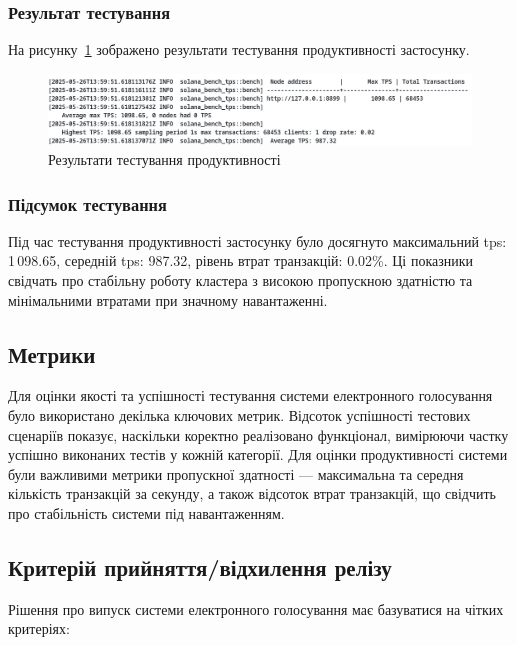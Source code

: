 \documentclass[14pt]{extreport}
\begin{document}
  \subsubsection*{Результат тестування}
  
  На рисунку~\ref{fig:prodtests} зображено результати тестування продуктивності застосунку.

  \begin{figure}[H]
    \centering
    \includegraphics[width=\textwidth]{ProdTest}
    \caption{Результати тестування продуктивності}
    \label{fig:prodtests}
  \end{figure}
  
  \subsubsection*{Підсумок тестування}
  
  Під час тестування продуктивності застосунку було досягнуто максимальний \gls{tps}: 1\,098.65, середній \gls{tps}: 987.32, рівень втрат транзакцій: 0.02\%. Ці показники свідчать про стабільну роботу кластера з високою пропускною здатністю та мінімальними втратами при значному навантаженні.
  
  \subsection{Метрики}
  
  Для оцінки якості та успішності тестування системи електронного голосування було використано декілька ключових метрик. Відсоток успішності тестових сценаріїв показує, наскільки коректно реалізовано функціонал, вимірюючи частку успішно виконаних тестів у кожній категорії. Для оцінки продуктивності системи були важливими метрики пропускної здатності — максимальна та середня кількість транзакцій за секунду, а також відсоток втрат транзакцій, що свідчить про стабільність системи під навантаженням.
  
  \subsection{Критерій прийняття/відхилення релізу}
  
  Рішення про випуск системи електронного голосування має базуватися на чітких критеріях:
\end{document}
